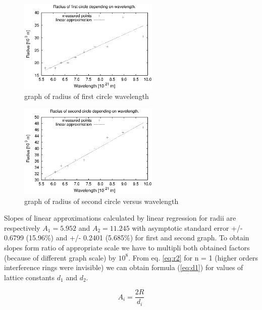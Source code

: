 \documentclass[a4paper,12pt]{article}
\begin{document}
\begin{figure}[H]
    \begin{center}
        \includegraphics[width=0.60\textwidth]{r-ang1}
        \caption{graph of radius of first circle wavelength}
        \label{fig:r-ang1}
    \end{center}
\end{figure}

\begin{figure}[H]
    \begin{center}
        \includegraphics[width=0.60\textwidth]{r-ang2}
        \caption{graph of radius of second circle versus wavelength}
        \label{fig:r-ang2}
    \end{center}
\end{figure}

Slopes of linear approximations calculated by linear regression for radii are respectively $A_1 = 5.952$ and $A_2 = 11.245$ with asymptotic standard error +/- 0.6799 (15.96\%) and +/- 0.2401 (5.685\%) for first and second graph. To obtain slopes form ratio of appropriate scale we have to multipli both obtained factors (because of different graph scale) by $10^8$. From eq. \ref{eq:r2} for n = 1 (higher orders interference rings were invisible) we can obtain formula (\ref{eq:d1}) for values of lattice constants $d_1$ and $d_2$.

\begin{equation}
    A_i = \frac{2R}{d_i} \label{eq:d1}
\end{equation}
\end{document}
